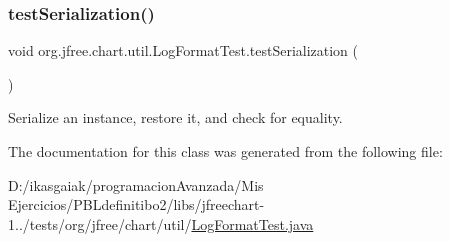 \subsubsection{\texorpdfstring{test\+Serialization()}{testSerialization()}}
{\footnotesize\ttfamily void org.\+jfree.\+chart.\+util.\+Log\+Format\+Test.\+test\+Serialization (\begin{DoxyParamCaption}{ }\end{DoxyParamCaption})}

Serialize an instance, restore it, and check for equality. 

The documentation for this class was generated from the following file\+:\begin{DoxyCompactItemize}
\item 
D\+:/ikasgaiak/programacion\+Avanzada/\+Mis Ejercicios/\+P\+B\+Ldefinitibo2/libs/jfreechart-\/1../tests/org/jfree/chart/util/\mbox{\hyperlink{_log_format_test_8java}{Log\+Format\+Test.\+java}}\end{DoxyCompactItemize}
